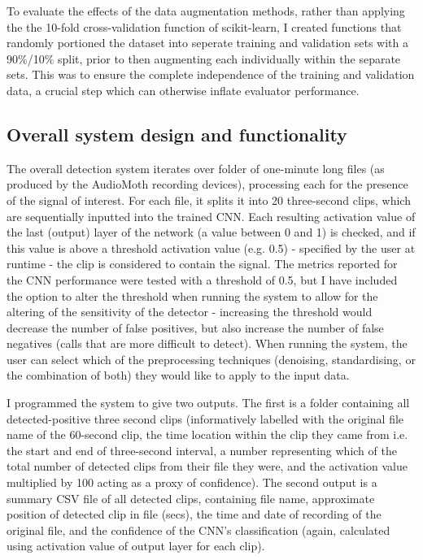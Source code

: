 \documentclass[11pt]{article}
\begin{document}
To evaluate the effects of the data augmentation methods, rather than applying the the 10-fold cross-validation function of scikit-learn, I created functions that randomly portioned the dataset into seperate training and validation sets with a 90\%/10\% split, prior to then augmenting each individually within the separate sets. This was to ensure the complete independence of the training and validation data, a crucial step which can otherwise inflate evaluator performance. 

\subsection{Overall system design and functionality}

The overall detection system iterates over folder of one-minute long files (as produced by the AudioMoth recording devices), processing each for the presence of the signal of interest. For each file, it splits it into 20 three-second clips, which are sequentially inputted into the trained CNN. Each resulting activation value of the last (output) layer of the network (a value between 0 and 1) is checked, and if this value is above a threshold activation value (e.g. 0.5) - specified by the user at runtime - the clip is considered to contain the signal. The metrics reported for the CNN performance were tested with a threshold of 0.5, but I have included the option to alter the threshold when running the system to allow for the altering of the sensitivity of the detector - increasing the threshold would decrease the number of false positives, but also increase the number of false negatives (calls that are more difficult to detect). When running the system, the user can select which of the preprocessing techniques (denoising, standardising, or the combination of both) they would like to apply to the input data.

I programmed the system to give two outputs. The first is a folder containing all detected-positive three second clips (informatively labelled with the original file name of the 60-second clip, the time location within the clip they came from i.e. the start and end of three-second interval, a number representing which of the total number of detected clips from their file they were, and the activation value multiplied by 100 acting as a proxy of confidence). The second output is a summary CSV file of all detected clips, containing file name, approximate position of detected clip in file (secs), the time and date of recording of the original file, and the confidence of the CNN's classification (again, calculated using activation value of output layer for each clip). 
\end{document}
